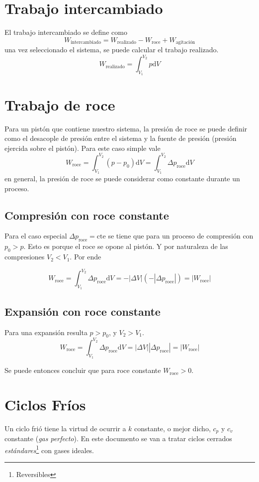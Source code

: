 \documentclass{article}
\newcommand{\ctegas}{k}
\newcommand{\cte}{\textrm{cte}}
\newcommand{\di}{\textrm{d}}
\begin{document}
\section{Trabajo intercambiado}
El trabajo intercambiado se define como 
\begin{equation}
    W_{\textrm{intercambiado}}= W_{\textrm{realizado}} - W_{\textrm{roce}} + W_{\textrm{agitación}}
\end{equation}
una vez seleccionado el sistema, se puede calcular el trabajo realizado.
\[
W_{\textrm{realizado}} = \int_{V_1}^{V_2}p \di V
\]

\section{Trabajo de roce}
Para un pistón que contiene nuestro sistema, la presión de roce se puede definir como el desacople de presión entre el sistema y la fuente de presión (presión ejercida sobre el pistón). Para este caso simple vale
\[
W_{\textrm{roce}} = \int_{V_1}^{V_2}(p-p_0)\di V =\int_{V_1}^{V_2}\Delta p_{\textrm{roce}}\di V 
\]
en general, la presión de roce se puede considerar como constante durante un proceso. 
\subsection{Compresión con roce constante}
Para el caso especial $\Delta p_{\textrm{roce}}=\cte$ se tiene que para un proceso de compresión con $p_0>p$. Esto es porque el roce se opone al pistón. Y por naturaleza de las compresiones $V_2<V_1$. Por ende

\[
W_{\textrm{roce}} = \int_{V_1}^{V_2}\Delta p_{\textrm{roce}} \di V = -|\Delta V| \left(-|\Delta p_{\textrm{roce}}|\right) = \left|W_{\textrm{roce}}\right| 
\]


\subsection{Expansión con roce constante}
Para una expansión resulta $p>p_0$, y $V_2>V_1$.
\[
W_{\textrm{roce}} = \int_{V_1}^{V_2}\Delta p_{\textrm{roce}} \di V = |\Delta V| |\Delta p_{\textrm{roce}}| = \left|W_{\textrm{roce}}\right|
\]

Se puede entonces concluir que para roce constante $W_{\textrm{roce}}>0$. 

\section{Ciclos Fríos}
Un ciclo frió tiene la virtud de ocurrir a $\ctegas$ constante, o mejor dicho, $c_p$ y $c_v$ constante (\textit{gas perfecto}). En este documento se van a tratar ciclos cerrados \textit{estándares}\footnote{Reversibles} con gases ideales. 
\end{document}
